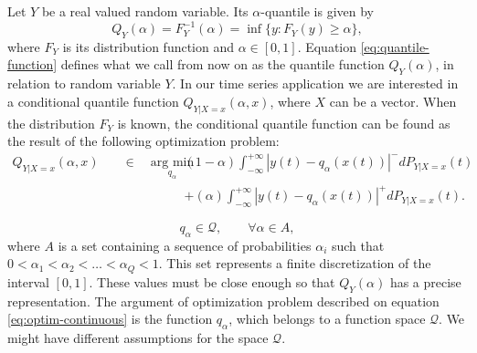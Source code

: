 Let $Y$ be a real valued random variable. Its $\alpha$-quantile is given by 
\begin{equation}
Q_Y(\alpha) = F_Y^{-1}(\alpha) = \inf\{y: F_Y(y) \geq \alpha\},
\label{eq:quantile-function}
\end{equation}
where $F_Y$ is its distribution function and $\alpha \in [0,1]$. Equation \ref{eq:quantile-function} defines what we call from now on as the quantile function $Q_Y(\alpha)$, in relation to random variable $Y$. In our time series application we are interested in a conditional quantile function $Q_{Y|X=x}(\alpha, x)$, where $X$ can be a vector.
When the distribution $F_Y$ is known, the conditional quantile function can be found as the result of the following optimization problem:
\begin{eqnarray}
Q_{Y|X=x}(\alpha,x)\quad & \in\quad\underset{q_\alpha}{\text{arg min}}\, &
(1-\alpha)\int_{-\infty}^{+\infty}|y(t)-q_\alpha(x(t))|^{-}dP_{Y|X=x}(t) \label{eq:optim-continuous}
 \\ & & + (\alpha)\int_{-\infty}^{+\infty}|y(t)-q_\alpha(x(t))|^{+}dP_{Y|X=x}(t). \nonumber
\end{eqnarray}
 
\begin{equation}
  q_\alpha  \in \mathcal{Q}, \qquad \forall {\alpha \in A}, 
\end{equation}
where $A$ is a set containing a sequence of probabilities  $\alpha_i$ such that $0 < \alpha_1 < \alpha_2 < \dots < \alpha_Q < 1$. This set represents a finite discretization of the interval $[0,1]$. These values must be close enough so that $Q_Y(\alpha)$ has a precise representation. The argument of optimization problem described on equation \ref{eq:optim-continuous} is the function $q_\alpha$, which belongs to a function space $\mathcal{Q}$. We might have different assumptions for the space $\mathcal{Q}$.


